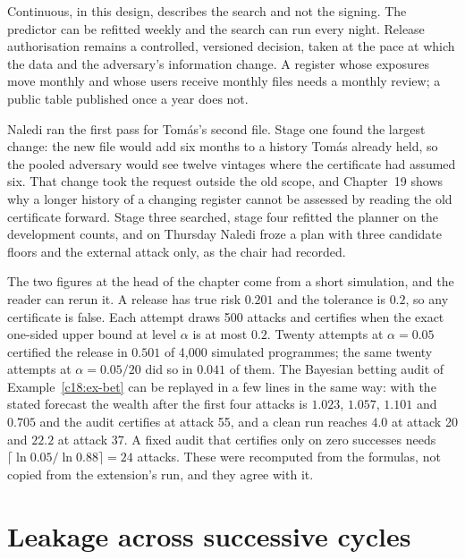 Continuous, in this design, describes the search and not the signing. The predictor can
be refitted weekly and the search can run every night. Release authorisation remains a controlled, versioned decision, taken at the pace at which the data and the adversary's information change. A register whose exposures move monthly and whose users receive monthly
files needs a monthly review; a public table published once a year does not.

Naledi ran the first pass for Tom\'as's second file. Stage one found the largest change: the
new file would add six months to a history Tom\'as already held, so the pooled adversary
would see twelve vintages where the certificate had assumed six. That change took the
request outside the old scope, and Chapter~19 shows why a longer history of a changing
register cannot be assessed by reading the old certificate forward. Stage three searched,
stage four refitted the planner on the development counts, and on Thursday Naledi froze a
plan with three candidate floors and the external attack only, as the chair had recorded.

\begin{remark}
The two figures at the head of the chapter come from a short simulation, and the reader can rerun it. A release has true risk $0.201$ and the tolerance is $0.2$, so any certificate is false. Each attempt draws 500 attacks and certifies when the exact one-sided upper bound at level $\alpha$ is at most $0.2$. Twenty attempts at $\alpha=0.05$ certified the release in $0.501$ of 4,000 simulated programmes; the same twenty attempts at $\alpha=0.05/20$ did so in $0.041$ of them. The Bayesian betting audit of Example~\ref{c18:ex-bet} can be replayed in a few lines in the same way: with the stated forecast the wealth after the first four attacks is $1.023$, $1.057$, $1.101$ and $0.705$ and the audit certifies at attack 55, and a clean run reaches $4.0$ at attack 20 and $22.2$ at attack 37. A fixed audit that certifies only on zero successes needs $\lceil\ln 0.05/\ln 0.88\rceil=24$ attacks. These were recomputed from the formulas, not copied from the extension's run, and they agree with it.
\end{remark}

\section{Leakage across successive cycles}\label{c18:sec-leak}

